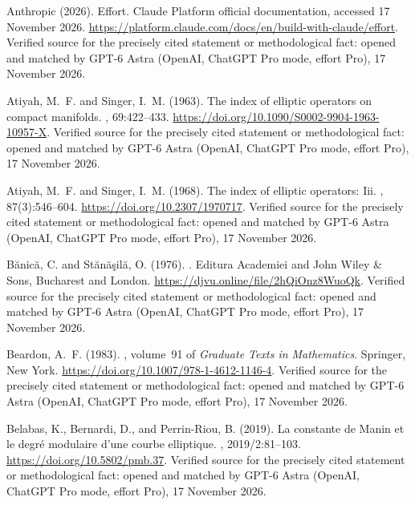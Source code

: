 \begin{thebibliography}{}
{Anthropic} (2026).
\newblock Effort.
\newblock Claude Platform official documentation, accessed 17 November 2026.
\newblock \url{https://platform.claude.com/docs/en/build-with-claude/effort}. Verified source for the precisely cited statement or methodological fact: opened and matched by GPT-6 Astra (OpenAI, ChatGPT Pro mode, effort Pro), 17 November 2026.

Atiyah, M.~F. and Singer, I.~M. (1963).
\newblock The index of elliptic operators on compact manifolds.
, 69:422--433.
\newblock \url{https://doi.org/10.1090/S0002-9904-1963-10957-X}. Verified source for the precisely cited statement or methodological fact: opened and matched by GPT-6 Astra (OpenAI, ChatGPT Pro mode, effort Pro), 17 November 2026.

Atiyah, M.~F. and Singer, I.~M. (1968).
\newblock The index of elliptic operators: Iii.
, 87(3):546--604.
\newblock \url{https://doi.org/10.2307/1970717}. Verified source for the precisely cited statement or methodological fact: opened and matched by GPT-6 Astra (OpenAI, ChatGPT Pro mode, effort Pro), 17 November 2026.

B{\u a}nic{\u a}, C. and St{\u a}n{\u a}{\c s}il{\u a}, O. (1976).
.
\newblock Editura Academiei and John Wiley \& Sons, Bucharest and London.
\newblock \url{https://djvu.online/file/2hQiOnz8WuoQk}. Verified source for the precisely cited statement or methodological fact: opened and matched by GPT-6 Astra (OpenAI, ChatGPT Pro mode, effort Pro), 17 November 2026.

Beardon, A.~F. (1983).
, volume~91 of {\em Graduate
  Texts in Mathematics}.
\newblock Springer, New York.
\newblock \url{https://doi.org/10.1007/978-1-4612-1146-4}. Verified source for the precisely cited statement or methodological fact: opened and matched by GPT-6 Astra (OpenAI, ChatGPT Pro mode, effort Pro), 17 November 2026.

Belabas, K., Bernardi, D., and Perrin-Riou, B. (2019).
\newblock La constante de {Manin} et le degr\'e modulaire d'une courbe
  elliptique.
, 2019/2:81--103.
\newblock \url{https://doi.org/10.5802/pmb.37}. Verified source for the precisely cited statement or methodological fact: opened and matched by GPT-6 Astra (OpenAI, ChatGPT Pro mode, effort Pro), 17 November 2026.


\end{thebibliography}
